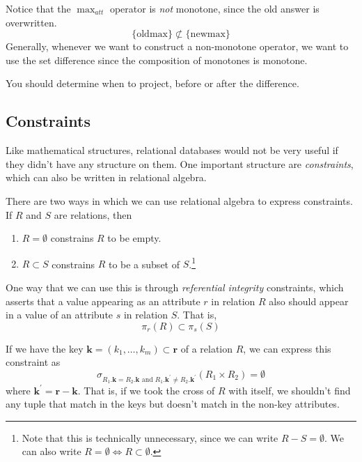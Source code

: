 \documentclass{article}
\begin{document}
  Notice that the $\max_{att}$ operator is \textit{not} monotone, since the old answer is overwritten. 
  \begin{equation}
    \{\mathrm{old max}\} \not\subset \{\mathrm{new max}\}
  \end{equation}
  Generally, whenever we want to construct a non-monotone operator, we want to use the set difference since the composition of monotones is monotone. 

    You should determine when to project, before or after the difference. 

  \subsection{Constraints}

    Like mathematical structures, relational databases would not be very useful if they didn't have any structure on them. One important structure are \textit{constraints}, which can also be written in relational algebra. 

    \begin{definition}
      There are two ways in which we can use relational algebra to express constraints. If $R$ and $S$ are relations, then 
      \begin{enumerate}
        \item $R = \emptyset$ constrains $R$ to be empty.
        \item $R \subset S$ constrains $R$ to be a subset of $S$.\footnote{Note that this is technically unnecessary, since we can write $R - S = \emptyset$. We can also write $R = \emptyset \iff R \subset \emptyset$.}
      \end{enumerate}
    \end{definition} 

    \begin{definition}
      One way that we can use this is through \textit{referential integrity} constraints, which asserts that a value appearing as an attribute $r$ in relation $R$ also should appear in a value of an attribute $s$ in relation $S$. That is, 
      \begin{equation}
        \pi_r (R) \subset \pi_s (S)
      \end{equation}
    \end{definition}

    \begin{definition}
      If we have the key $\mathbf{k} = (k_1, \ldots, k_m) \subset \mathbf{r}$ of a relation $R$, we can express this constraint as 
      \begin{equation}
        \sigma_{R_1.\mathbf{k} = R_2.\mathbf{k} \text{ and } R_1.\mathbf{k}^\prime \neq R_2.\mathbf{k}^\prime} (R_1 \times R_2) = \emptyset
      \end{equation}
      where $\mathbf{k}^\prime = \mathbf{r} - \mathbf{k}$. That is, if we took the cross of $R$ with itself, we shouldn't find any tuple that match in the keys but doesn't match in the non-key attributes. 
    \end{definition}
\end{document}
